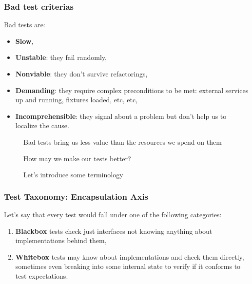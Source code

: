 \documentclass[usenames,dvipsnames]{beamer}
\begin{document}
\begin{frame}
  \frametitle{Bad test criterias}

  Bad tests are:
  \begin{itemize}
    \item \textbf{Slow},
    \item \textbf{Unstable}: they fail randomly,
    \item \textbf{Nonviable}: they don’t survive refactorings,
    \item \textbf{Demanding}: they require complex preconditions to be met: external services up and running, fixtures loaded, etc, etc,
    \item \textbf{Incomprehensible}: they signal about a problem but don’t help us to localize the cause.
  \end{itemize}
\end{frame}

\begin{frame}
  \begin{figure}
  \Huge Bad tests bring us less value than the resources we spend on them
  \end{figure}
\end{frame}

\begin{frame}
  \begin{figure}
  \Huge How may we make our tests better?
  \end{figure}
\end{frame}

\begin{frame}
  \begin{figure}
  \Huge Let's introduce some terminology
  \end{figure}
\end{frame}

\begin{frame}
  \frametitle{Test Taxonomy: Encapsulation Axis}
  Let's say that every test would fall under one of the following categories:

  \begin{enumerate}
    \item \textbf{Blackbox} tests check just interfaces not knowing anything about implementations behind them,
    \item \textbf{Whitebox} tests may know about implementations and check them directly, sometimes even breaking into some internal state to verify if it conforms to test expectations.
  \end{enumerate}
\end{frame}
\end{document}
